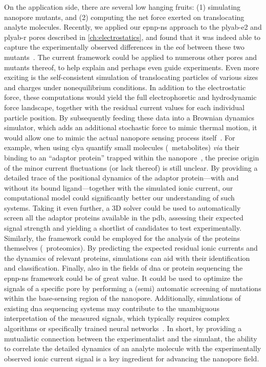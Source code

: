 On the application side, there are several low hanging fruits: (1) simulating nanopore mutants, and (2)
computing the net force exerted on translocating analyte molecules. Recently, we applied our \gls{epnp-ns}
approach to the \gls{plyab-e2} and \gls{plyab-r} pores described in \cref{ch:electrostatics}, and found that
it was indeed able to capture the experimentally observed differences in the \gls{eof} between these two
mutants~\cite{Huang-2020}. The current framework could be applied to numerous other pores and mutants thereof,
to help explain and perhaps even guide experiments. Even more exciting is the self-consistent simulation of
translocating particles of various sizes and charges under nonequilibrium conditions. In addition to the
electrostatic force, these computations would yield the full electrophoretic and hydrodynamic force landscape,
together with the residual current values for each individual particle position. By subsequently feeding these
data into a Brownian dynamics simulator, which adds an additional stochastic force to mimic thermal motion, it
would allow one to mimic the actual nanopore sensing process itself~\cite{Pederson-2015,Hulings-2018}. For
example, when using \gls{clya} quantify small molecules (\eg~metabolites) \textit{via} their binding to an
``adaptor protein'' trapped within the nanopore~\cite{Zernia-2020}, the precise origin of the minor current
fluctuations (or lack thereof) is still unclear. By providing a detailed trace of the positional dynamics of
the adaptor protein---with and without its bound ligand---together with the simulated ionic current, our
computational model could significantly better our understanding of such systems. Taking it even further, a 3D
solver could be used to automatically screen all the adaptor proteins available in the \gls{pdb}, assessing
their expected signal strength and yielding a shortlist of candidates to test experimentally. Similarly, the
framework could be employed for the analysis of the proteins themselves (\ie~proteomics). By predicting the
expected residual ionic currents and the dynamics of relevant proteins, simulations can aid with their
identification and classification. Finally, also in the fields of \gls{dna} or protein sequencing the
\gls{epnp-ns} framework could be of great value. It could be used to optimize the signals of a specific pore
by performing a (semi) automatic screening of mutations within the base-sensing region of the nanopore.
Additionally, simulations of existing \gls{dna} sequencing systems may contribute to the unambiguous
interpretation of the measured signals, which typically requires complex algorithms or specifically trained
neural networks~\cite{Wick-2019}. In short, by providing a mutualistic connection between the experimentalist
and the simulant, the ability to correlate the detailed dynamics of an analyte molecule with the
experimentally observed ionic current signal is a key ingredient for advancing the nanopore field.



\cleardoublepage


